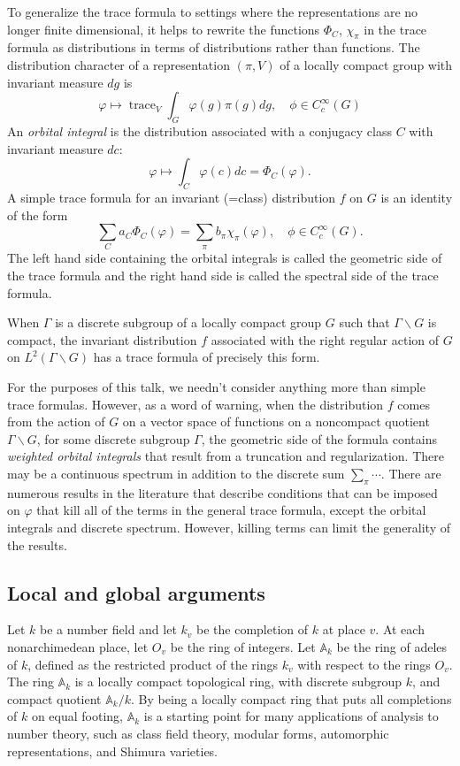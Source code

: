 \documentclass[brochure,english,12pt]{bourbaki}
\def\op#1{{\operatorname{#1}}}
\newcommand{\ring}[1]{\mathbb{#1}}
\def\A{\ring{A}}
\begin{document}
To generalize the trace formula to settings where the representations are no longer
finite dimensional, it helps to rewrite the functions $\Phi_C$, $\chi_\pi$
in the trace formula as distributions in terms of distributions rather than functions.
The distribution character of a representation $(\pi,V)$ of a locally compact group with
invariant measure $dg$ is 
\[\varphi \mapsto \op{trace}_V \int_G \varphi(g)\pi(g) dg, \quad \phi\in C_c^\infty(G)
\]
An {\it orbital integral} is the distribution associated with a conjugacy class $C$ with
invariant measure $dc$:
\[
\varphi \mapsto\int_C \varphi(c) dc  = \Phi_C(\varphi).
\]
A simple trace formula for an invariant (=class) distribution $f$ on $G$ is an identity of the
form 
\[
 \sum_C a_C \Phi_C(\varphi) = \sum_{\pi} b_\pi \chi_\pi(\varphi),\quad  \phi\in C_c^\infty(G).
\]
The left hand side containing the orbital integrals is called the
geometric side of the trace formula and the right hand side is called
the spectral side of the trace formula.

When $\Gamma$ is a discrete subgroup of a locally compact group $G$
such that $\Gamma\backslash G$ is compact, the invariant distribution
$f$ associated with the right regular action of $G$ on
$L^2(\Gamma\backslash G)$ has a trace formula of precisely this form.

For the purposes of this talk, we needn't consider anything more than
simple trace formulas.  However, as a word of warning, when the
distribution $f$ comes from the action of $G$ on a vector space of
functions on a noncompact quotient $\Gamma\backslash G$, for some
discrete subgroup $\Gamma$, the geometric side of the formula contains
{\it weighted orbital integrals} that result from a truncation and
regularization.  There may be a continuous spectrum in addition to the
discrete sum $\sum_\pi \cdots$.  There are numerous results in the
literature that describe conditions that can be imposed on $\varphi$
that kill all of the terms in the general trace formula, except the
orbital integrals and discrete spectrum.  However, killing terms can
limit the generality of the results.


\subsection{Local and global arguments}

Let $k$ be a number field and let $k_v$ be the completion of $k$ at
place $v$.  At each nonarchimedean place, let $O_v$ be the ring of
integers.  Let $\A_k$ be the ring of adeles of $k$, defined as the
restricted product of the rings $k_v$ with respect to the rings $O_v$.
The ring $\A_k$ is a locally compact topological ring, with discrete
subgroup $k$, and compact quotient $\A_k/k$.  By being a locally
compact ring that puts all completions of $k$ on equal footing, $\A_k$
is a starting point for many applications of analysis to number
theory, such as class field theory, modular forms, automorphic
representations, and Shimura varieties.
\end{document}
